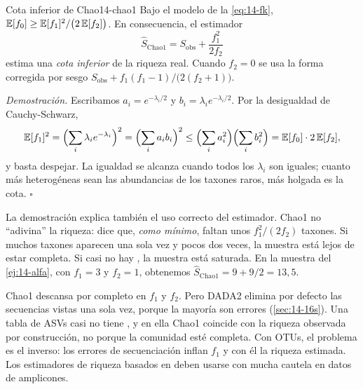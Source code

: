 \begin{simbolos}
\end{simbolos}

\begin{teorema}{Cota inferior de Chao}{14-chao1}
Bajo el modelo de la \cref{eq:14-fk}, $\mathbb{E}[f_0] \ge \mathbb{E}[f_1]^2 / \bigl(2\,\mathbb{E}[f_2]\bigr)$. En consecuencia, el estimador
\begin{equation}\label{eq:14-chao1}
\hat{S}_{\text{Chao1}} = S_{\text{obs}} + \frac{f_1^2}{2 f_2}
\end{equation}
estima una \emph{cota inferior} de la riqueza real. Cuando $f_2 = 0$ se usa la forma corregida por sesgo $S_{\text{obs}} + f_1(f_1-1)/\bigl(2(f_2+1)\bigr)$.
\end{teorema}

\emph{Demostración.} Escribamos $a_i = e^{-\lambda_i/2}$ y $b_i = \lambda_i e^{-\lambda_i/2}$. Por la desigualdad de Cauchy-Schwarz,
\[
\mathbb{E}[f_1]^2 = \Bigl(\sum_i \lambda_i e^{-\lambda_i}\Bigr)^2 = \Bigl(\sum_i a_i b_i\Bigr)^2 \le \Bigl(\sum_i a_i^2\Bigr)\Bigl(\sum_i b_i^2\Bigr) = \mathbb{E}[f_0]\cdot 2\,\mathbb{E}[f_2],
\]
y basta despejar. La igualdad se alcanza cuando todos los $\lambda_i$ son iguales; cuanto más heterogéneas sean las abundancias de los taxones raros, más holgada es la cota. $\square$

La demostración explica también el uso correcto del estimador. Chao1 no ``adivina'' la riqueza: dice que, \emph{como mínimo}, faltan unos $f_1^2/(2f_2)$ taxones. Si muchos taxones aparecen una sola vez y pocos dos veces, la muestra está lejos de estar completa. Si casi no hay , la muestra está saturada. En la muestra del \cref{ej:14-alfa}, con $f_1=3$ y $f_2=1$, obtenemos $\hat{S}_{\text{Chao1}} = 9 + 9/2 = 13{,}5$.

\begin{cuidado}
Chao1 descansa por completo en $f_1$ y $f_2$. Pero DADA2 elimina por defecto las secuencias vistas una sola vez, porque la mayoría son errores (\cref{sec:14-16s}). Una tabla de ASVs casi no tiene , y en ella Chao1 coincide con la riqueza observada por construcción, no porque la comunidad esté completa. Con OTUs, el problema es el inverso: los errores de secuenciación inflan $f_1$ y con él la riqueza estimada. Los estimadores de riqueza basados en  deben usarse con mucha cautela en datos de amplicones.
\end{cuidado}


